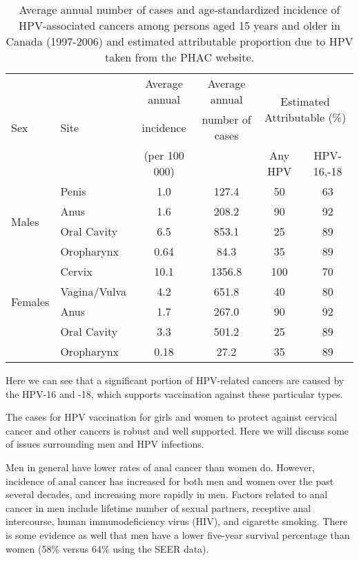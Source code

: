 \documentclass[12pt]{article}
\begin{document}
\begin{table}[h!]
\begin{tabular}{l | l | c | c | c | c}
\multirow{3}{*}{Sex} & \multirow{3}{*}{Site} & Average annual & Average annual & \multicolumn{2}{c}{\multirow{2}{*}{Estimated Attributable (\%)}} \\

 & & incidence & number of cases & \multicolumn{2}{c}{} \\
 \cline{5-6}
 & & (per 100 000) & & Any HPV & HPV-16,-18\\
 \hline\hline
 \multirow{4}{*}{Males} & Penis & 1.0 & 127.4 & 50 & 63\\
 & Anus & 1.6 & 208.2 & 90 & 92\\
 & Oral Cavity & 6.5 & 853.1 & 25 & 89 \\
 & Oropharynx & 0.64 & 84.3 & 35 & 89\\
 \hline
 \multirow{4}{*}{Females} & Cervix & 10.1 & 1356.8 & 100 & 70\\
 & Vagina/Vulva & 4.2 & 651.8 & 40 & 80 \\
 & Anus & 1.7 & 267.0 & 90 & 92 \\
 & Oral Cavity & 3.3 & 501.2 & 25 & 89\\
 & Oropharynx & 0.18 & 27.2 & 35 & 89\\
\end{tabular}
\caption{Average annual number of cases and age-standardized incidence of HPV-associated cancers among persons aged 15 years and older in Canada (1997-2006) and estimated attributable proportion due to HPV taken from the PHAC website.}
\end{table}
Here we can see that a significant portion of HPV-related cancers are caused by the HPV-16 and -18, which supports vaccination against these particular types.  

The cases for HPV vaccination for girls and women to protect against cervical cancer and other cancers is robust and well supported.  Here we will discuss some of issues surrounding men and HPV infections.  

Men in general have lower rates of anal cancer than women do.  However, incidence of anal cancer has increased for both men and women over the past several decades, and increasing more rapidly in men.  Factors related to anal cancer in men include lifetime number of sexual partners, receptive anal intercourse, human immunodeficiency virus (HIV), and cigarette smoking. There is some evidence as well that men have a lower five-year survival percentage than women (58\% versus 64\% using the SEER data). 
\end{document}

